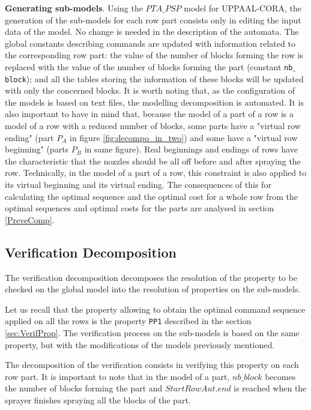 \textbf{Generating sub-models}. Using the $PTA\_PSP$ model for UPPAAL-CORA, the generation of the sub-models for each row part consists only in editing the input data of the model. No change is needed in the description of the automata. The global constants describing commands are updated with information related to the corresponding row part: the value of the number of blocks forming the row is replaced with the value of the number of blocks forming the part (constant \texttt{nb$\_$block}); and all the tables storing the information of these blocks will be updated with only the concerned blocks.
It is worth noting that, as the configuration of the models is based on text files, the modelling decomposition is automated. It is also important to have in mind that, because the model of a part of a row is a model of a row with a reduced number of blocks, some parts have a "virtual row ending" (part $P_A$ in figure \ref{fig:decompo_in_two}) and some have a "virtual row beginning" (parts $P_B$ in same figure). Real beginnings and endings of rows have the characteristic that the nozzles should be all off before and after spraying the row. Technically, in the model of a part of a row, this constraint is also applied to its virtual beginning and its virtual ending. The consequences of this for calculating the optimal sequence and the optimal cost for a whole row from the optimal sequences and optimal costs for the parts are analysed in section \ref{PreveComp}.


\subsection{Verification Decomposition}
\label{VD}
The verification decomposition decomposes the resolution of the property to be checked on the global model into the resolution of properties on the sub-models.

Let us recall that the property allowing to obtain the optimal command sequence applied on all the rows is the property \texttt{PP1} 
described in the section \ref{sec:VerifProp}. The verification process on the sub-models is based on the same property, but with the modifications of the models previously mentioned.

The decomposition of the verification consists in verifying this property on each row part. It is important to note that in the model of a part, $ nb\_block $ becomes the number of blocks forming the part and $ StartRowAut.end $ is reached when the sprayer finishes spraying all the blocks of the part. 

